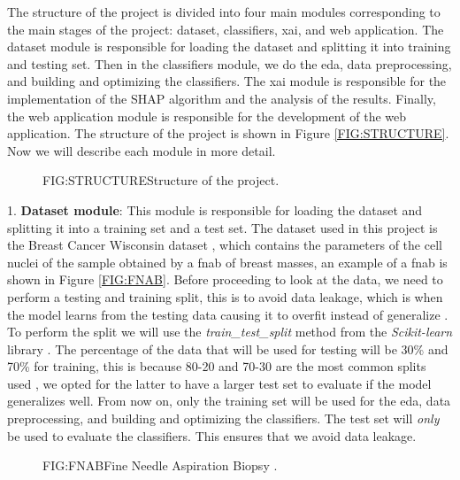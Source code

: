 
The structure of the project is divided into four main modules corresponding to the main stages of the project: dataset, classifiers, \ac{xai}, and web application. The dataset module is responsible for loading the dataset and splitting 
it into training and testing set.
Then in the classifiers module, we do the \ac{eda}, data preprocessing, and building and optimizing the classifiers. The \ac{xai} module is responsible for the implementation of the SHAP algorithm and the analysis of the results. Finally, the web application module is responsible for the development of the web application. The structure of the project is shown in Figure \ref{FIG:STRUCTURE}. Now we will describe each module in more detail.

\begin{figure}[Structure of the project]{FIG:STRUCTURE}{Structure of the project.}
\end{figure}

1. \textbf{Dataset module}: This module is responsible for loading the dataset and splitting it into a training set and a test set. The dataset used in this project is the Breast Cancer Wisconsin dataset \cite{william_wolberg_breast_1993}, which contains the parameters of the cell nuclei of the sample obtained by a \ac{fnab} of breast masses, an example of a \ac{fnab} is shown in Figure \ref{FIG:FNAB}.
Before proceeding to look at the data, we need to perform a testing and training split, this is to avoid data leakage, 
which is when the model learns from the testing data causing it to overfit instead of generalize \cite{wang_machine_2020}. 
To perform the split we will use the \textit{train\_test\_split} method from the \textit{Scikit-learn} library \cite{pedregosa_scikit-learn_2011}.
The percentage of the data that will be used for testing will be 30\% and 70\% for training, this is because 80-20 and 70-30 are the most common splits used \cite{racz_effect_2021}, we opted for the latter to have a larger test set to evaluate if the model generalizes well.
From now on, only the training set will be used for the \acl{eda}, data preprocessing, and building and optimizing the classifiers. The test set will \textit{only} be used to evaluate the classifiers. This ensures that we avoid data leakage.



\begin{figure}[Fine Needle Aspiration Biopsy]{FIG:FNAB}{Fine Needle Aspiration Biopsy \cite{sidey-gibbons_machine_2019}.}
\end{figure}


